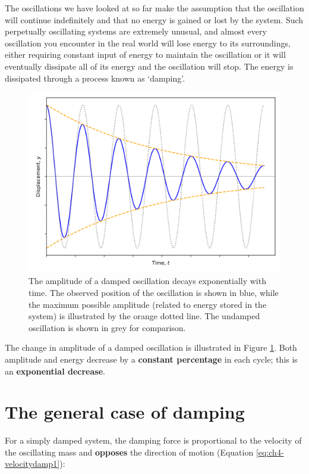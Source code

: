 \documentclass[
]{book}
\begin{document}
The oscillations we have looked at so far make the assumption that the oscillation will continue indefinitely and that no energy is gained or lost by the system. Such perpetually oscillating systems are extremely unusual, and almost every oscillation you encounter in the real world will lose energy to its surroundings, either requiring constant input of energy to maintain the oscillation or it will eventually dissipate all of its energy and the oscillation will stop. The energy is dissipated through a process known as `damping'.

\begin{figure}

{\centering \includegraphics[width=0.7\linewidth]{visualisations/ch4-dampedoscill1} 

}

\caption{The amplitude of a damped oscillation decays exponentially with time.  The observed position of the oscillation is shown in blue, while the maximum possible amplitude (related to energy stored in the system) is illustrated by the orange dotted line.  The undamped oscillation is shown in grey for comparison.}\label{fig:ch4-dampedoscillation1}
\end{figure}

The change in amplitude of a damped oscillation is illustrated in Figure \ref{fig:ch4-dampedoscillation1}. Both amplitude and energy decrease by a \textbf{constant percentage} in each cycle; this is an \textbf{exponential decrease}.

\hypertarget{sec-ch4-generalcasedamping}{%
\section{The general case of damping}\label{sec-ch4-generalcasedamping}}

For a simply damped system, the damping force is proportional to the velocity of the oscillating mass and \textbf{opposes} the direction of motion (Equation \eqref{eq:ch4-velocitydamp1}):
\end{document}
